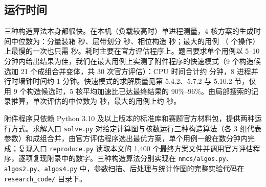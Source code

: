 \subsection{运行时间}

三种构造算法本身都很快。在本机（负载较高时）单进程测量，4 核方案的生成时间中位数为：分量装箱  秒、层带划分  秒、相位构造  秒；最大的用例 （ 个操作）上最慢的一次也只需  秒。耗时主要在官方评估程序上。题目要求单个用例以 5--10 分钟内给出结果为佳，我们在最大用例上实测了附件程序的快速模式（9 个构造候选加 21 个成组合并变体，共 30 次官方评估）：CPU 时间合计约  分钟，8 进程并行时墙钟时间约 1 分钟。快速模式的求解质量见第 5.4.2、5.7.2 与 5.10.2 节，仅用 9 个构造候选时，5 核平均加速比已达最终结果的 90\%--96\%。由局部搜索的记录推算，单次评估的中位数为  秒，最大的用例上约  秒。

附件程序只依赖 Python 3.10 及以上版本的标准库和赛题官方材料包，提供两种运行方式。求解入口 \texttt{solve.py} 对给定计算图与核数运行三种构造算法（各 3 组代表参数）和成组合并，由官方评估程序选出最优方案，单个用例一般在数分钟内完成；复现入口 \texttt{reproduce.py} 读取本文的 1{,}400 个最终方案文件并调用官方评估程序，逐项复现附录中的数字。三种构造算法分别实现在 \texttt{nmcs/algos.py}、\texttt{algos2.py}、\texttt{algos4.py} 中，参数扫描、后处理与统计作图的完整实验代码在 \texttt{research\_code/} 目录下。
